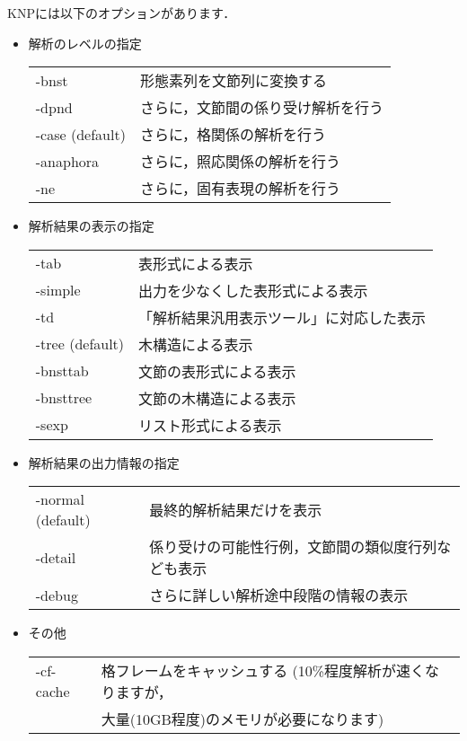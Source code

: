 \documentclass[a4j,11pt,titlepage]{jarticle}
\begin{document}
KNPには以下のオプションがあります．
\begin{itemize}
\item 解析のレベルの指定

\begin{tabular}{ll}
-bnst           & 形態素列を文節列に変換する \\
-dpnd           & さらに，文節間の係り受け解析を行う \\
-case (default) & さらに，格関係の解析を行う \\
-anaphora       & さらに，照応関係の解析を行う \\
-ne             & さらに，固有表現の解析を行う \\
\end{tabular}
\item 解析結果の表示の指定

\begin{tabular}{ll}
-tab            & 表形式による表示 \\
-simple         & 出力を少なくした表形式による表示 \\
-td             & 「解析結果汎用表示ツール」\footnotemark に対応した表示 \\
-tree (default) & 木構造による表示 \\
-bnsttab        & 文節の表形式による表示 \\
-bnsttree       & 文節の木構造による表示 \\
-sexp           & リスト形式による表示 \\
\end{tabular}

\item 解析結果の出力情報の指定

\begin{tabular}{ll}
-normal (default) & 最終的解析結果だけを表示 \\
-detail           & 係り受けの可能性行例，文節間の類似度行列なども表示 \\
-debug            & さらに詳しい解析途中段階の情報の表示 \\
\end{tabular}
\item その他

\begin{tabular}{ll}
-cf-cache         & 格フレームをキャッシュする (10\%程度解析が速くなりますが，\\
                  & 大量(10GB程度)のメモリが必要になります) \\
\end{tabular}
\end{itemize}
\end{document}
